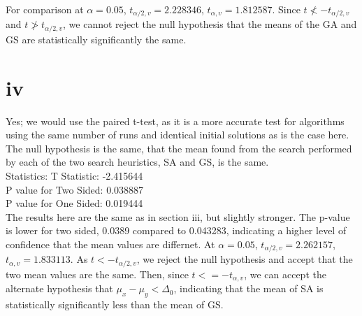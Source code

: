 \documentclass[12pt]{article}
\begin{document}
For comparison at $\alpha = 0.05$, $t_{\alpha/2,v} = 2.228346$, $t_{\alpha, v}  = 1.812587$. Since $t \nless -t_{\alpha/2,v}$ and $t \ngtr t_{\alpha/2,v}$, we cannot reject the null hypothesis that the means of the GA and GS are statistically significantly the same.


\section{iv}
Yes; we would use the paired t-test, as it is a more accurate test for algorithms using the same number of runs and identical initial solutions as is the case here. The null hypothesis is the same, that the mean found from the search performed by each of the two search heuristics, SA and GS, is the same. \\

Statistics: T Statistic: -2.415644\\ 
P value for Two Sided: 0.038887\\
P value for One Sided: 0.019444\\

The results here are the same as in section iii, but slightly stronger. The p-value is lower for two sided, 0.0389 compared to 0.043283, indicating a higher level of confidence that the mean values are differnet. At $\alpha = 0.05$, $t_{\alpha/2,v} = 2.262157$, $t_{\alpha, v}  = 1.833113$. As $t < -t_{\alpha/2,v}$, we reject the null hypothesis and accept that the two mean values are the same. Then, since $t <= -t_{\alpha, v}$, we can accept the alternate hypothesis that $\mu_x - \mu_y < \Delta_0$, indicating that the mean of SA is statistically significantly less than the mean of GS.\\\\
\end{document}
